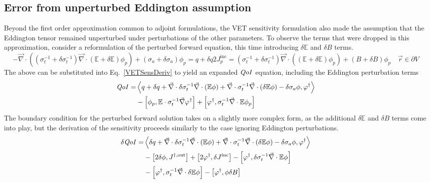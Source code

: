 \documentclass[12pt]{report}
\newcommand{\vr}{\vec{r}}
\newcommand{\bra}{\left\langle}
\newcommand{\ket}{\right\rangle}
\newcommand{\sbra}{\left[}
\newcommand{\sket}{\right]}
\renewcommand{\div}{\vec{\nabla} \cdot}
\newcommand{\grad}{\vec{\nabla}}
\newcommand{\vefadj}{\varphi^\dag}
\newcommand{\Edd}{\mathbb{E}}
\newcommand{\BEdd}{B}
\newcommand{\siga}{\sigma_a}
\newcommand{\isigt}{\sigma_t^{-1}}
\newcommand{\scalSource}{q}
\newcommand{\qoi}{{\it QoI}\xspace}
\begin{document}
\subsection{Error from unperturbed Eddington assumption}

Beyond the first order approximation common to adjoint formulations, the VET sensitivity formulation also made the assumption that the Eddington tensor remained unperturbed under perturbations of the other parameters. To observe the terms that were dropped in this approximation, consider a reformulation of the perturbed forward equation, this time introducing $\delta \Edd$ and $\delta  B$ terms. 
\begin{subequations}
\begin{equation}
\label{VEFPerEdd}
- \div \left((\isigt + \delta \isigt)\div (\Edd + \delta \Edd) \phi_p \right) + (\siga + \delta \siga)\phi_p = \scalSource + \delta \scalSource
\end{equation}
\begin{equation}
2J_p^{\text{inc}} =
(\isigt + \delta \isigt) \vec{\nabla} \cdot \left((\Edd + \delta \Edd) \phi_p \right)  + (\BEdd +\delta \BEdd) \phi_p \quad \vr \in \partial V
\end{equation}
\end{subequations}
The above can be substituted into Eq.~\eqref{VETSensDeriv} to yield an expanded $\qoi$ equation, including the Eddington perturbation terms
\begin{equation}
\label{QoIVETAdjNoBCEdd}
\begin{split}
\qoi =& \bra \scalSource + \delta \scalSource + \div \delta \isigt \div \left( \Edd \phi \right) + \div \isigt \div \left( \delta \Edd \phi \right) - \delta \siga \phi, \vefadj \ket \\
&- \sbra \phi_p, \Edd \cdot \isigt \grad \vefadj \sket 
+ \sbra \vefadj , \isigt \div \Edd \phi_p \sket
\end{split}
\end{equation}
The boundary condition for the perturbed forward solution takes on a slightly more complex form, as the additional $\delta \Edd$ and $\delta \BEdd$ terms come into play, but the derivation of the sensitivity proceeds similarly to the case ignoring Eddington perturbations.
\begin{equation}
\label{QoIVETAdjEdd}
\begin{split}
\delta \qoi =& \bra \delta \scalSource + \div \delta \isigt \div \left( \Edd \phi \right) + \div \isigt \div \left( \delta \Edd \phi \right) - \delta \siga \phi, \vefadj \ket \\
&- \sbra 2\delta \phi, J^{\dag, \text{out}} \sket  + \sbra 2 \vefadj, \delta J^{\text{inc}} \sket
- \sbra \vefadj, \delta \isigt \div \Edd \phi \sket
\\
&- \sbra  \vefadj ,\isigt \div \delta \Edd \phi \sket
- \sbra \vefadj, \phi \delta \BEdd \sket
\end{split}
\end{equation} 
\end{document}
